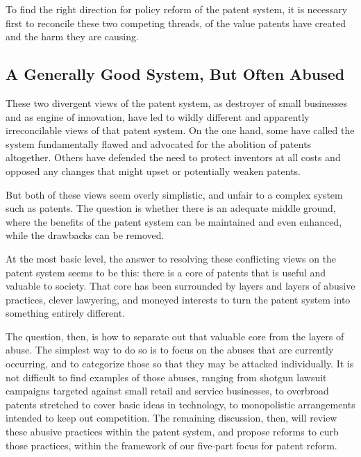 \documentclass[11pt,twocolumn,titlepage]{article}
\begin{document}
To find the right direction for policy reform of the patent system, it is
necessary first to reconcile these two competing threads, of the value patents
have created and the harm they are causing.

\subsection{A Generally Good System, But Often Abused}
\SectionNote

These two divergent views of the patent system, as destroyer of small
businesses and as engine of innovation, have led to wildly different and
apparently irreconcilable views of that patent system. On the one hand, some
have called the system fundamentally flawed and advocated for the abolition of
patents altogether. Others have
defended the need to protect inventors at all costs and opposed any changes that
might upset or potentially weaken patents.

But both of these views seem overly simplistic, and unfair to a complex system
such as patents. The question is whether there is an adequate middle ground,
where the benefits of the patent system can be maintained and even enhanced,
while the drawbacks can be removed.

At the most basic level, the answer to resolving these conflicting views on the
patent system seems to be this: there is a core of patents that is useful and
valuable to society. That core has been surrounded by layers and layers of
abusive practices, clever lawyering, and moneyed interests to turn the patent
system into something entirely different.

The question, then, is how to separate out that valuable core from the layers of
abuse. The simplest way to do so is to focus on the abuses that are currently
occurring, and to categorize those so that they may be attacked individually. It
is not difficult to find examples of those abuses, ranging from shotgun lawsuit
campaigns targeted against small retail and service businesses, to overbroad
patents stretched to cover basic ideas in technology, to monopolistic
arrangements intended to keep out competition. The remaining discussion, then,
will review these abusive practices within the patent system, and propose
reforms to curb those practices, within the framework of our five-part focus for
patent reform.
\end{document}
